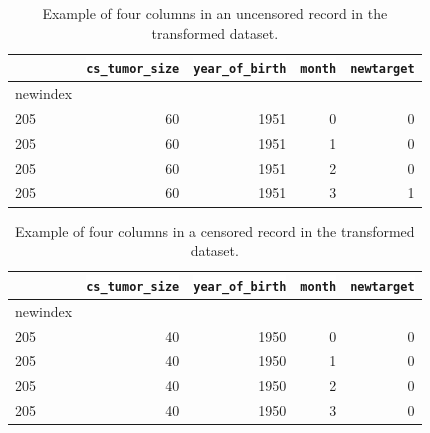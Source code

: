 \documentclass[a4paper,11pt]{article}
\newcommand{\codewhite}[1]{\colorbox{white}{\texttt{#1}}}
\begin{document}
\begin{table}[tbp]
\begin{center}
\begin{tabular}{lrrrr}
\toprule
{} &  \codewhite{cs\_tumor\_size} &  \codewhite{year\_of\_birth} &  \codewhite{month} &  \codewhite{newtarget} \\
\midrule
newindex &                &                &        &            \\
205      &             60 &           1951 &      0 &          0 \\
205      &             60 &           1951 &      1 &          0 \\
205      &             60 &           1951 &      2 &          0 \\
205      &             60 &           1951 &      3 &          1 \\
\bottomrule
\end{tabular}
\caption{\label{tab:transformeddead} Example of four columns in an uncensored record in the transformed dataset.}
\end{center}
\end{table}


\begin{table}[tbp]
\begin{center}
\begin{tabular}{lrrrr}
\toprule
{} &  \codewhite{cs\_tumor\_size} &  \codewhite{year\_of\_birth} &  \codewhite{month} &  \codewhite{newtarget} \\
\midrule
newindex &                &                &        &            \\
205      &             40 &           1950 &      0 &          0 \\
205      &             40 &           1950 &      1 &          0 \\
205      &             40 &           1950 &      2 &          0 \\
205      &             40 &           1950 &      3 &          0 \\
\bottomrule
\end{tabular}
\caption{\label{tab:transformedalive} Example of four columns in a censored record in the transformed dataset.}
\end{center}
\end{table}
\end{document}
